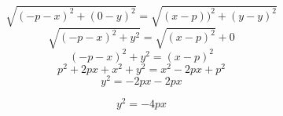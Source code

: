 \documentclass[16pt]{article}
\begin{document}
\begin{huge}
	\[ \sqrt{(-p-x)^2 + (0-y)^2} = \sqrt{(x-p))^2 + (y-y)^2}\]
	\[ \sqrt{(-p-x)^2 + y^2} = \sqrt{(x-p)^2} + 0\]
	\[ (-p-x)^2 + y^2 = (x - p)^2 \]
	\[	 p^2 +2px + x^2 + y^2 = x^2 - 2px + p^2\]
	\[ y^2 = -2px - 2px\]
	
	\[  y^2 = -4px\]
\end{huge}





  
\end{document}
